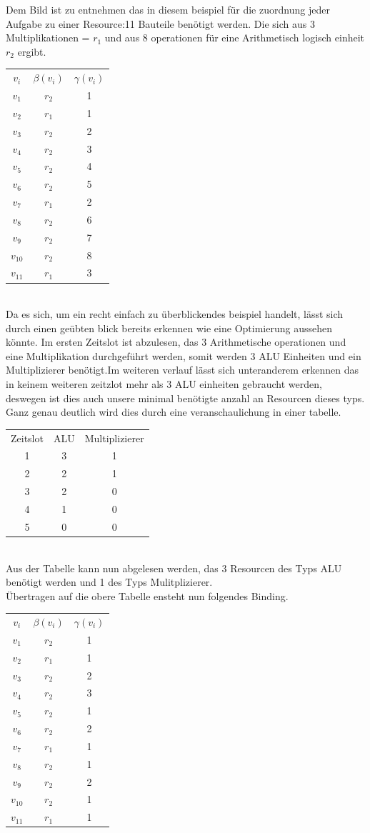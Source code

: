\documentclass[conference]{IEEEtran}
\begin{document}
Dem Bild ist zu entnehmen das in diesem beispiel für die zuordnung jeder Aufgabe zu einer Resource:11 Bauteile benötigt werden.
 Die sich aus 3 Multiplikationen = $r_1$ und aus 8 operationen für eine Arithmetisch logisch einheit $r_2$ ergibt.\\
\begin{tabular}[h]{ccc}
$v_i$&$\beta(v_i)$&$\gamma(v_i)$\\
$v_1$&$r_2$&1\\
$v_2$&$r_1$&1\\
$v_3$&$r_2$&2\\
$v_4$&$r_2$&3\\
$v_5$&$r_2$&4\\
$v_6$&$r_2$&5\\
$v_7$&$r_1$&2\\
$v_8$&$r_2$&6\\
$v_9$&$r_2$&7\\
$v_10$&$r_2$&8\\
$v_11$&$r_1$&3\\
\end{tabular}
\\Da es sich, um ein recht einfach zu überblickendes beispiel handelt, lässt sich durch einen geübten blick bereits erkennen wie eine Optimierung aussehen könnte. Im ersten Zeitslot ist abzulesen, das 3 Arithmetische operationen und eine Multiplikation durchgeführt werden, somit werden 3 ALU Einheiten und ein Multiplizierer benötigt.Im weiteren verlauf lässt sich unteranderem erkennen das in keinem weiteren zeitzlot mehr als 3 ALU einheiten gebraucht werden, deswegen ist dies auch unsere minimal benötigte anzahl an Resourcen dieses typs. Ganz genau deutlich wird dies durch eine veranschaulichung in einer tabelle.
\begin{tabular}[h]{ccc}
Zeitslot&ALU&Multiplizierer\\
1&3&1\\
2&2&1\\
3&2&0\\
4&1&0\\
5&0&0\\
\end{tabular}
\\Aus der Tabelle kann nun abgelesen werden, das 3 Resourcen des Typs ALU benötigt werden und 1 des Typs Mulitplizierer.\\
Übertragen auf die obere Tabelle ensteht nun folgendes Binding.\\
\begin{tabular}[h]{ccc}
$v_i$&$\beta(v_i)$&$\gamma(v_i)$\\
$v_1$&$r_2$&1\\
$v_2$&$r_1$&1\\
$v_3$&$r_2$&2\\
$v_4$&$r_2$&3\\
$v_5$&$r_2$&1\\
$v_6$&$r_2$&2\\
$v_7$&$r_1$&1\\
$v_8$&$r_2$&1\\
$v_9$&$r_2$&2\\
$v_10$&$r_2$&1\\
$v_11$&$r_1$&1\\
\end{tabular}
\end{document}
